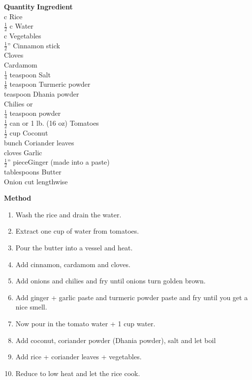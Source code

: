 \begin{tabbing}
\hspace{1.0cm}  \={\bf Quantity}   \hspace{3.0cm} \={\bf Ingredient}\\
  c   \>Rice\\
  $\frac{1}{2}$ c   \>Water\\
  c   \>Vegetables\\
 \>$\frac{1}{2}$''   \>Cinnamon stick\\
    \>Cloves\\
    \>Cardamom\\
  $\frac{1}{4}$ teaspoon   \>Salt\\
 \>$\frac{1}{8}$ teaspoon   \>Turmeric powder\\
  teaspoon   \>Dhania powder\\
     \>Chilies or \\
\> $\frac{1}{4}$ teaspoon powder\>\\
 \>$\frac{1}{2}$ can or 1 lb. (16 oz)   \>Tomatoes\\
 \>$\frac{1}{2}$ cup   \>Coconut\\
  bunch   \>Coriander leaves\\
 cloves    \>Garlic\\
\> $\frac{1}{2}$'' piece\>Ginger (made into a paste)\\
 tablespoons   \>Butter\\
     \>Onion cut lengthwise\\
\end{tabbing}

{\bf Method}
\begin{enumerate}
   \item Wash the rice and drain the water.
   \item Extract one cup of water from tomatoes.
   \item Pour the butter into a vessel and heat.
   \item Add cinnamon, cardamom and cloves.
   \item Add onions and chilies and fry until onions turn golden brown.
   \item Add ginger + garlic paste and turmeric powder paste and fry until you
      get a nice smell.
   \item Now pour in the tomato water + 1 cup water.
   \item Add coconut, coriander powder (Dhania powder), salt and let boil
  \item Add rice + coriander leaves + vegetables.
  \item Reduce to low heat and let the rice cook.
\end{enumerate}


